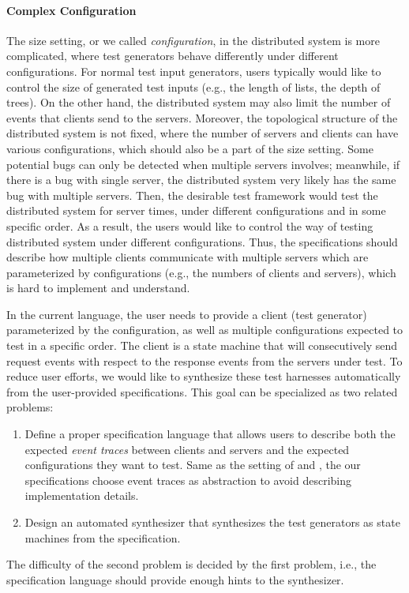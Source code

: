 \paragraph{Complex Configuration} The size setting, or we called \emph{configuration}, in the distributed system is more complicated, where test generators behave differently under different configurations. For normal test input generators, users typically would like to control the size of generated test inputs (e.g., the length of lists, the depth of trees). On the other hand, the distributed system may also limit the number of events that clients send to the servers. Moreover, the topological structure of the distributed system is not fixed, where the number of servers and clients can have various configurations, which should also be a part of the size setting. Some potential bugs can only be detected when multiple servers involves; meanwhile, if there is a bug with single server, the distributed system very likely has the same bug with multiple servers. Then, the desirable test framework would test the distributed system for server times, under different configurations and in some specific order.
As a result, the users would like to control the way of testing distributed system under different configurations. Thus, the specifications should describe how multiple clients communicate with multiple servers which are parameterized by configurations (e.g., the numbers of clients and servers), which is hard to implement and understand.

In the current  language, the user needs to provide a client (test generator) parameterized by the configuration, as well as multiple configurations expected to test in a specific order. The client is a state machine that will consecutively send request events with respect to the response events from the servers under test. To reduce user efforts, we would like to synthesize these test harnesses automatically from the user-provided specifications.
This goal can be specialized as two related problems:
\begin{enumerate}
    \item Define a proper specification language that allows users to describe both the expected \emph{event traces} between clients and servers and the expected configurations they want to test. Same as the setting of  and , the our specifications choose event traces as abstraction to avoid describing implementation details.
    \item Design an automated synthesizer that synthesizes the test generators as state machines from the specification.
\end{enumerate}
The difficulty of the second problem is decided by the first problem, i.e., the specification language should provide enough hints to the synthesizer.

